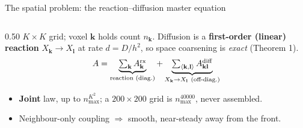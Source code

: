 \documentclass[10pt,aspectratio=169]{beamer}
\begin{document}
\begin{frame}{The spatial problem: the reaction--diffusion master equation}

  \begin{columns}[T]
    \begin{column}{0.50\textwidth}
      $K\times K$ grid; voxel $\mathbf k$ holds count $n_\mathbf{k}$. Diffusion is a
      \textbf{first-order (linear) reaction} $X_\mathbf{k}\to X_\mathbf{l}$ at rate
      $d=D/h^2$, so space coarsening is \emph{exact} (Theorem 1).
      \[
        A=\underbrace{\textstyle\sum_\mathbf{k} A^{\rm rx}_\mathbf{k}}_{\text{reaction (diag.)}}
         +\underbrace{\textstyle\sum_{\langle\mathbf k,\mathbf l\rangle} A^{\rm diff}_{\mathbf k\mathbf l}}_{X_\mathbf{k}\to X_\mathbf{l}\ \text{(off-diag.)}}
      \]
      \begin{itemize}\setlength\itemsep{0.35em}
        \item \textbf{Joint} law, up to $n_{\max}^{K^2}$; a $200{\times}200$ grid is
              $n_{\max}^{40000}$, never assembled.
        \item Neighbour-only coupling $\Rightarrow$ smooth, near-steady away from the front.
      \end{itemize}


\end{column}
\end{columns}
\end{frame}
\end{document}
